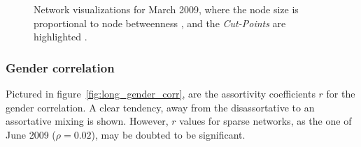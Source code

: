 \begin{figure}[htpb]%
	\centering 
	
	\qquad 			
	\caption[Network visualizations for March 2009]{Network visualizations for March 2009, where the node size is proportional to node betweenness , and the \textit{Cut-Points} are highlighted .}
	 \label{fig:graphs_march}
\end{figure} 


\subsubsection{Gender correlation}

Pictured in figure~\ref{fig:long_gender_corr}, are the assortivity coefficients $r$ for the gender correlation. A clear tendency, away from the disassortative to an assortative mixing is shown. However, $r$ values for sparse networks, as the one of June 2009 ($\rho = 0.02$), may be doubted to be significant.

